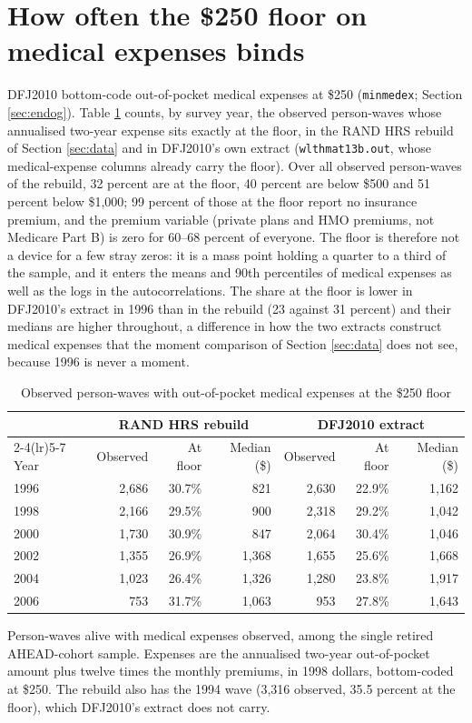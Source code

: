 \documentclass[11pt,fleqn]{article}
\begin{document}
\section{How often the \$250 floor on medical expenses binds}\label{app:medexfloor}
DFJ2010 bottom-code out-of-pocket medical expenses at \$250 (\texttt{minmedex}; Section \ref{sec:endog}). Table \ref{tab:medexfloor} counts, by survey year, the observed person-waves whose annualised two-year expense sits exactly at the floor, in the RAND HRS rebuild of Section \ref{sec:data} and in DFJ2010's own extract (\texttt{wlthmat13b.out}, whose medical-expense columns already carry the floor). Over all observed person-waves of the rebuild, 32 percent are at the floor, 40 percent are below \$500 and 51 percent below \$1,000; 99 percent of those at the floor report no insurance premium, and the premium variable (private plans and HMO premiums, not Medicare Part B) is zero for 60--68 percent of everyone. The floor is therefore not a device for a few stray zeros: it is a mass point holding a quarter to a third of the sample, and it enters the means and 90th percentiles of medical expenses as well as the logs in the autocorrelations. The share at the floor is lower in DFJ2010's extract in 1996 than in the rebuild (23 against 31 percent) and their medians are higher throughout, a difference in how the two extracts construct medical expenses that the moment comparison of Section \ref{sec:data} does not see, because 1996 is never a moment.

\begin{table}[htbp]
\centering
\caption{Observed person-waves with out-of-pocket medical expenses at the \$250 floor}\label{tab:medexfloor}
\small
\begin{tabular}{lrrrrrr}
\toprule
 & \multicolumn{3}{c}{RAND HRS rebuild} & \multicolumn{3}{c}{DFJ2010 extract} \\
\cmidrule(lr){2-4}\cmidrule(lr){5-7}
Year & Observed & At floor & Median (\$) & Observed & At floor & Median (\$) \\
\midrule
1996 & 2,686 & 30.7\% & 821 & 2,630 & 22.9\% & 1,162 \\
1998 & 2,166 & 29.5\% & 900 & 2,318 & 29.2\% & 1,042 \\
2000 & 1,730 & 30.9\% & 847 & 2,064 & 30.4\% & 1,046 \\
2002 & 1,355 & 26.9\% & 1,368 & 1,655 & 25.6\% & 1,668 \\
2004 & 1,023 & 26.4\% & 1,326 & 1,280 & 23.8\% & 1,917 \\
2006 & 753 & 31.7\% & 1,063 & 953 & 27.8\% & 1,643 \\
\bottomrule
\end{tabular}
\par\smallskip
\begin{minipage}{0.9\textwidth}\footnotesize
Person-waves alive with medical expenses observed, among the single retired AHEAD-cohort sample. Expenses are the annualised two-year out-of-pocket amount plus twelve times the monthly premiums, in 1998 dollars, bottom-coded at \$250. The rebuild also has the 1994 wave (3,316 observed, 35.5 percent at the floor), which DFJ2010's extract does not carry.
\end{minipage}
\end{table}



\end{document}
